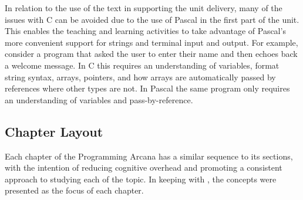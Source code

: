 In relation to the use of the text in supporting the unit delivery, many of the issues with C can be avoided due to the use of Pascal in the first part of the unit. This enables the teaching and learning activities to take advantage of Pascal's more convenient support for strings and terminal input and output. For example, consider a program that asked the user to enter their name and then echoes back a welcome message. In C this requires an understanding of variables, format string syntax, arrays, pointers, and how arrays are automatically passed by references where other types are not. In Pascal the same program only requires an understanding of variables and pass-by-reference.



\clearpage
\subsection{Chapter Layout} %
\label{ssub:chapter_layout}

Each chapter of the Programming Arcana has a similar sequence to its sections, with the intention of reducing cognitive overhead and promoting a consistent approach to studying each of the topic. In keeping with , the concepts were presented as the focus of each chapter.

